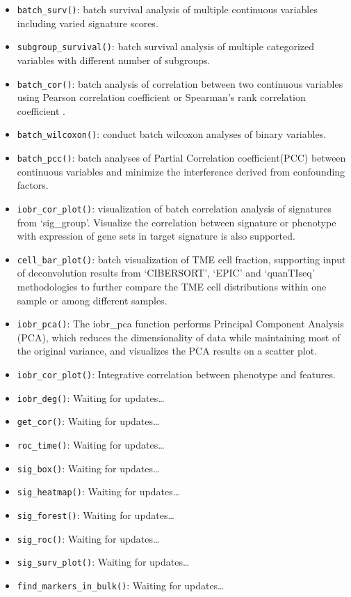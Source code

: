 \documentclass[
  12pt,
]{book}
\providecommand{\tightlist}{%
  \setlength{\itemsep}{0pt}\setlength{\parskip}{0pt}}
\begin{document}
\begin{itemize}
  \begin{itemize}
  \tightlist
  \item
    \texttt{batch\_surv()}: batch survival analysis of multiple continuous variables including varied signature scores.
  \item
    \texttt{subgroup\_survival()}: batch survival analysis of multiple categorized variables with different number of subgroups.
  \item
    \texttt{batch\_cor()}: batch analysis of correlation between two continuous variables using Pearson correlation coefficient or Spearman's rank correlation coefficient .
  \item
    \texttt{batch\_wilcoxon()}: conduct batch wilcoxon analyses of binary variables.
  \item
    \texttt{batch\_pcc()}: batch analyses of Partial Correlation coefficient(PCC) between continuous variables and minimize the interference derived from confounding factors.
  \item
    \texttt{iobr\_cor\_plot()}: visualization of batch correlation analysis of signatures from `sig\_group'. Visualize the correlation between signature or phenotype with expression of gene sets in target signature is also supported.
  \item
    \texttt{cell\_bar\_plot()}: batch visualization of TME cell fraction, supporting input of deconvolution results from `CIBERSORT', `EPIC' and `quanTIseq' methodologies to further compare the TME cell distributions within one sample or among different samples.
  \item
    \texttt{iobr\_pca()}: The iobr\_pca function performs Principal Component Analysis (PCA), which reduces the dimensionality of data while maintaining most of the original variance, and visualizes the PCA results on a scatter plot.
  \item
    \texttt{iobr\_cor\_plot()}: Integrative correlation between phenotype and features.
  \item
    \texttt{iobr\_deg()}: Waiting for updates\ldots{}
  \item
    \texttt{get\_cor()}: Waiting for updates\ldots{}
  \item
    \texttt{roc\_time()}: Waiting for updates\ldots{}
  \item
    \texttt{sig\_box()}: Waiting for updates\ldots{}
  \item
    \texttt{sig\_heatmap()}: Waiting for updates\ldots{}
  \item
    \texttt{sig\_forest()}: Waiting for updates\ldots{}
  \item
    \texttt{sig\_roc()}: Waiting for updates\ldots{}
  \item
    \texttt{sig\_surv\_plot()}: Waiting for updates\ldots{}
  \item
    \texttt{find\_markers\_in\_bulk()}: Waiting for updates\ldots{}
  \end{itemize}
\end{itemize}
\end{document}
